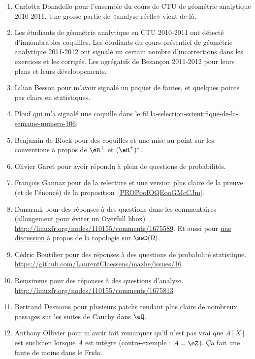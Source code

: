\begin{enumerate}
    \item
        Carlotta Donadello pour l'ensemble du cours de CTU de géométrie analytique 2010-2011. Une grosse partie de «analyse réelle» vient de là.
    \item
        Les étudiants de géométrie analytique en CTU 2010-2011 ont détecté d'innombrables coquilles. Les étudiants du cours présentiel de géométrie analytique 2011-2012 ont signalé un certain nombre d'incorrections dans les exercices et les corrigés. Les agrégatifs de Besançon 2011-2012 pour leurs plans et leurs développements.
    \item
        Lilian Besson pour m'avoir signalé un paquet de fautes, et quelques points pas clairs en statistiques.
    \item
        Plouf qui m'a signalé une coquille dans le fil \href{http://passeurdesciences.blog.lemonde.fr/2014/01/24/la-selection-scientifique-de-la-semaine-numero-106}{la-selection-scientifique-de-la-semaine-numero-106}.
    \item
        Benjamin de Block pour des coquilles et une mise au point sur les conventions à propos de \( \eR^+\) et \( (\eR^+)^*\).
    \item
        Olivier Garet pour avoir répondu à plein de questions de probabilités.
    \item
        François Gannaz pour de la relecture et une version plus claire de la preuve (et de l'énoncé) de la proposition~\ref{PROPooIOQEooGMcCJm}.
    \item
        Danarmk pour des réponses à des questions dans les commentaires (allongement pour éviter un Overfull hbox) \url{http://linuxfr.org/nodes/110155/comments/1675589}. Et aussi pour \href{ https://github.com/LaurentClaessens/mazhe/issues/87 }{ une discussion } à propos de la topologie sur \( \swD(\Omega)\).
    \item
        Cédric Boutilier pour des réponses à des questions de probabilité statistique. \url{https://github.com/LaurentClaessens/mazhe/issues/16}
    \item
        Remsirems pour des réponses à des questions d'analyse. \url{http://linuxfr.org/nodes/110155/comments/1675813}
    \item
        Bertrand Desmons pour plusieurs patchs rendant plus clairs de nombreux passages sur les suites de Cauchy dans \( \eQ\).
    \item
        Anthony Ollivier pour m'avoir fait remarquer qu'il n'est pas vrai que \( A[X]\) est euclidien lorsque \( A\) est intègre (contre-exemple : \( A=\eZ\)). Ça fait une faute de moins dans le Frido.

\end{enumerate}
